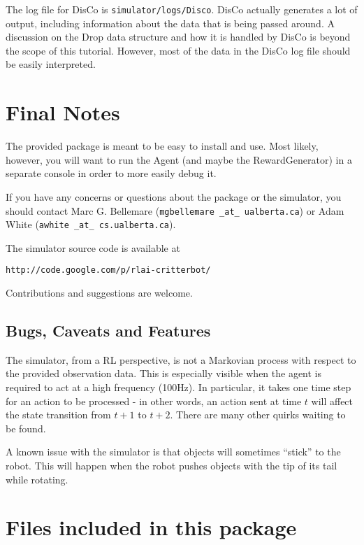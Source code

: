 \documentclass[12pt]{article}
\begin{document}
The log file for DisCo is \verb+simulator/logs/Disco+. DisCo actually generates 
a lot of output, including information about the data
that is being passed around. A discussion on the Drop data structure and how 
it is handled by DisCo is beyond the scope of this tutorial. However, most of 
the data in the DisCo log file should be easily interpreted.

\section{Final Notes}

The provided package is meant to be easy to install and use. Most likely,
however, you will want to run the Agent (and maybe the RewardGenerator) in
a separate console in order to more easily debug it.

If you have any concerns or questions about the package or the simulator,
you should contact Marc G. Bellemare (\texttt{mgbellemare \_at\_ ualberta.ca}) or Adam White (\texttt{awhite \_at\_ cs.ualberta.ca}).

The simulator source code is available at

\begin{verbatim}
http://code.google.com/p/rlai-critterbot/
\end{verbatim}

Contributions and suggestions are welcome.

\subsection{Bugs, Caveats and Features}

The simulator, from a RL perspective, is not a Markovian process with respect 
to the provided observation data. This is especially visible when the agent
is required to act at a high frequency (100Hz). In particular, it takes one
time step for an action to be processed - in other words, an action sent at
time $t$ will affect the state transition from $t+1$ to $t+2$. There are many
other quirks waiting to be found.

A known issue with the simulator is that objects will sometimes ``stick'' to the
robot. This will happen when the robot pushes objects with the tip of its tail
while rotating.

\newpage

\section{Files included in this package}
\end{document}

